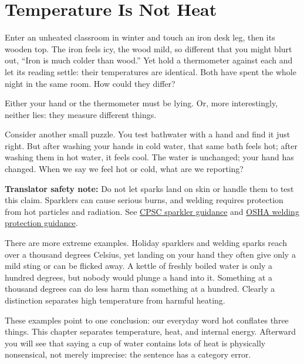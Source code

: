 \chapter{Temperature Is Not Heat}


\begin{mainline}
Enter an unheated classroom in winter and touch an iron desk leg, then its wooden top. The iron feels icy, the wood mild, so different that you might blurt out, ``Iron is much colder than wood.'' Yet hold a thermometer against each and let its reading settle: their temperatures are identical. Both have spent the whole night in the same room. How could they differ?

Either your hand or the thermometer must be lying. Or, more interestingly, neither lies: they measure different things.

Consider another small puzzle. You test bathwater with a hand and find it just right. But after washing your hands in cold water, that same bath feels hot; after washing them in hot water, it feels cool. The water is unchanged; your hand has changed. When we say we feel hot or cold, what are we reporting?

\textbf{Translator safety note:} Do not let sparks land on skin or handle them to test this claim. Sparklers can cause serious burns, and welding requires protection from hot particles and radiation. See \href{https://www.cpsc.gov/node/65701}{CPSC sparkler guidance} and \href{https://www.osha.gov/etools/shipyard/general-requirements/ppe/ppe-selection/hot-work}{OSHA welding protection guidance}.

There are more extreme examples. Holiday sparklers and welding sparks reach over a thousand degrees Celsius, yet landing on your hand they often give only a mild sting or can be flicked away. A kettle of freshly boiled water is only a hundred degrees, but nobody would plunge a hand into it. Something at a thousand degrees can do less harm than something at a hundred. Clearly a distinction separates high temperature from harmful heating.

These examples point to one conclusion: our everyday word hot conflates three things. This chapter separates temperature, heat, and internal energy. Afterward you will see that saying a cup of water contains lots of heat is physically nonsensical, not merely imprecise: the sentence has a category error.
\end{mainline}


